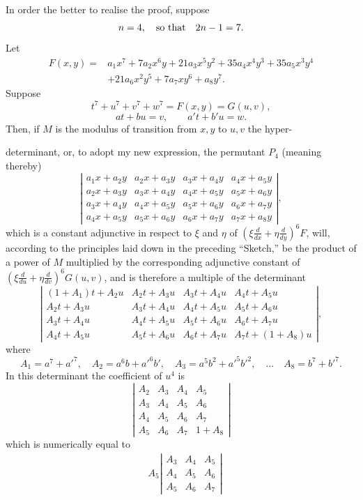 \documentclass[11pt]{article}
\newcommand{\sourcepage}[1]{\marginpar{\scriptsize p.~#1}}
\begin{document}
{{In order the better to realise the proof, suppose
\[
 n=4,\quad \hbox{so that}\quad 2n-1=7.
\]
Let
\[
\begin{aligned}
F(x,y)={}&a_1x^7+7a_2x^6y+21a_3x^5y^2+35a_4x^4y^3+35a_5x^3y^4\\
&+21a_6x^2y^5+7a_7xy^6+a_8y^7.
\end{aligned}
\]
Suppose
\[
 t^7+u^7+v^7+w^7=F(x,y)=G(u,v),
\]
\[
 at+bu=v,\qquad a't+b'u=w.
\]
Then, if $M$ is the modulus of transition from $x,y$ to $u,v$ the hyper-

\sourcepage{210}
determinant, or, to adopt my new expression, the permutant $P_4$ (meaning thereby)
\[
\left|
\begin{array}{cccc}
a_1x+a_2y&a_2x+a_3y&a_3x+a_4y&a_4x+a_5y\\
a_2x+a_3y&a_3x+a_4y&a_4x+a_5y&a_5x+a_6y\\
a_3x+a_4y&a_4x+a_5y&a_5x+a_6y&a_6x+a_7y\\
a_4x+a_5y&a_5x+a_6y&a_6x+a_7y&a_7x+a_8y
\end{array}\right|,
\]
which is a constant adjunctive in respect to $\xi$ and $\eta$ of $\left(\xi\frac{d}{dx}+\eta\frac{d}{dy}\right)^6F$, will, according to the principles laid down in the preceding ``Sketch,'' be the product of a power of $M$ multiplied by the corresponding adjunctive constant of $\left(\xi\frac{d}{du}+\eta\frac{d}{dv}\right)^6G(u,v)$, and is therefore a multiple of the determinant
\[
\left|
\begin{array}{cccc}
(1+A_1)t+A_2u&A_2t+A_3u&A_3t+A_4u&A_4t+A_5u\\
A_2t+A_3u&A_3t+A_4u&A_4t+A_5u&A_5t+A_6u\\
A_3t+A_4u&A_4t+A_5u&A_5t+A_6u&A_6t+A_7u\\
A_4t+A_5u&A_5t+A_6u&A_6t+A_7u&A_7t+(1+A_8)u
\end{array}\right|,
\]
where
\[
 A_1=a^7+a'^7,\quad
 A_2=a^6b+a'^6b',\quad
 A_3=a^5b^2+a'^5b'^2,\quad \ldots\quad
 A_8=b^7+b'^7.
\]
In this determinant the coefficient of $u^4$ is
\[
\left|
\begin{array}{cccc}
A_2&A_3&A_4&A_5\\
A_3&A_4&A_5&A_6\\
A_4&A_5&A_6&A_7\\
A_5&A_6&A_7&1+A_8
\end{array}\right|
\]
which is numerically equal to
\[
\begin{aligned}
& A_5\left|\begin{array}{ccc}A_3&A_4&A_5\\A_4&A_5&A_6\\A_5&A_6&A_7\end{array}\right|

\end{aligned}\]}}
\end{document}
